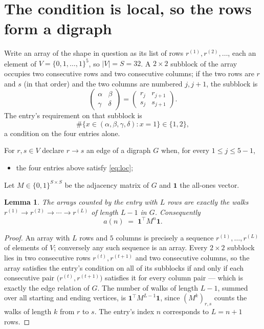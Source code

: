 \documentclass[11pt,a4paper]{article}
\theoremstyle{plain}
\newtheorem{lemma}[theorem]{Lemma}
\theoremstyle{definition}
\begin{document}
\section{The condition is local, so the rows form a digraph}

Write an array of the shape in question as its list of rows
$r^{(1)},r^{(2)},\dots$, each an element of
$V=\{0,1,\dots,1\}^{5}$, so $|V|=S=32$. A $2\times2$ subblock of the array
occupies two consecutive rows and two consecutive columns; if the two rows are $r$
and $s$ (in that order) and the two columns are numbered $j,j+1$,
the subblock is
\[
\begin{pmatrix}\alpha&\beta\\\gamma&\delta\end{pmatrix}=\begin{pmatrix}r_j&r_{j+1}\\s_j&s_{j+1}\end{pmatrix}.
\]
The entry's requirement on that subblock is
\begin{equation}\label{eq:loc}
\#\{x\in(\alpha,\beta,\gamma,\delta):x=1\}\in\{1,2\},
\end{equation}
a condition on the four entries alone.

For $r,s\in V$ declare $r\to s$ an edge of a digraph $G$ when, for every
$1\le j\le 5-1$,
\begin{itemize}
\item the four entries above satisfy \eqref{eq:loc};

\end{itemize}
Let $M\in\{0,1\}^{S\times S}$ be the adjacency matrix of $G$ and $\mathbf{1}$ the
all-ones vector.

\begin{lemma}\label{lem:walk}
The arrays counted by the entry with $L$ rows are exactly the walks
$r^{(1)}\to r^{(2)}\to\cdots\to r^{(L)}$ of length $L-1$ in $G$. Consequently
\[
a(n)\;=\;\mathbf{1}^{\!\top}M^{n}\mathbf{1} .
\]
\end{lemma}

\begin{proof}
An array with $L$ rows and $5$ columns is precisely a sequence
$r^{(1)},\dots,r^{(L)}$ of elements of $V$; conversely any such sequence is an array.
Every $2\times2$ subblock lies in two consecutive rows $r^{(t)},r^{(t+1)}$ and two
consecutive columns, so the array satisfies the entry's condition on all of its subblocks
if and only if each consecutive pair $\bigl(r^{(t)},r^{(t+1)}\bigr)$ satisfies it for
every column pair --- which is exactly the edge relation of $G$. The number of walks of
length $L-1$, summed over all starting and ending vertices, is
$\mathbf{1}^{\!\top}M^{L-1}\mathbf{1}$, since $(M^{k})_{r,s}$ counts the walks of
length $k$ from $r$ to $s$. The entry's index $n$ corresponds to $L=n+1$ rows.
\end{proof}
\end{document}
